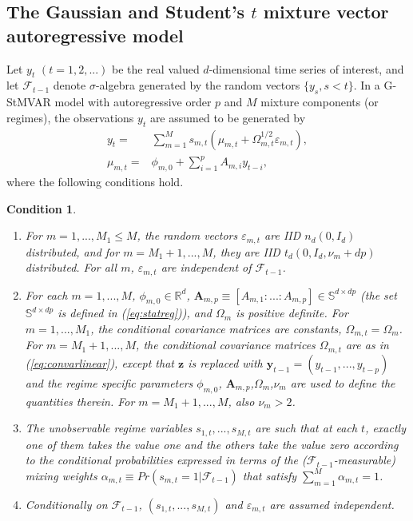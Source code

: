 \documentclass[nojss]{jss}
\newtheorem{condition}{Condition}
\begin{document}
\subsection{The Gaussian and Student's $t$ mixture vector autoregressive model}
Let $y_t$ $(t=1,2,...)$ be the real valued $d$-dimensional time series of interest, and let $\mathcal{F}_{t-1}$ denote $\sigma$-algebra generated by the random vectors $\lbrace y_s, s<t \rbrace$. In a G-StMVAR model \citep{Virolainen2:2021} with autoregressive order $p$ and $M$ mixture components (or regimes),  the observations $y_t$ are assumed to be generated by
\begin{align}
y_t = & \sum_{m=1}^Ms_{m,t}(\mu_{m,t} + \Omega_{m,t}^{1/2}\varepsilon_{m,t}),\label{eq:def} \\
\mu_{m,t} = & \phi_{m,0} + \sum_{i=1}^pA_{m,i}y_{t-i},\label{eq:mu_mt}
\end{align}
where the following conditions hold.
%
\begin{condition}\label{cond:def}
\
\begin{enumerate}
\item For $m=1,...,M_1\leq M$,  the random vectors $\varepsilon_{m,t}$ are IID $n_d(0, I_d)$ distributed,  and for $m=M_1+1,..., M$, they are IID $t_d(0, I_d,\nu_m + dp)$ distributed. For all $m$,  $\varepsilon_{m,t}$ are independent of $\mathcal{F}_{t-1}$.
\item For each $m=1,...,M$‚ $\phi_{m,0}\in\mathbb{R}^d$,  $\boldsymbol{A}_{m,p} \equiv [A_{m,1}:...:A_{m,p}]\in\mathbb{S}^{d\times dp}$ (the set $\mathbb{S}^{d\times dp}$ is defined in (\ref{eq:statreg})),  and $\Omega_m$ is positive definite.  For $m=1,...,M_1$,  the conditional covariance matrices are constants, $\Omega_{m,t}=\Omega_m$.  For $m=M_1+1,...,M$,  the conditional covariance matrices $\Omega_{m,t}$ are as in (\ref{eq:convarlinear}), except that $\boldsymbol{z}$ is replaced with $\boldsymbol{y}_{t-1}=(y_{t-1},...,y_{t-p})$ and the regime specific parameters $\phi_{m,0}$, $\boldsymbol{A}_{m,p}$,$\Omega_m$,$\nu_m$ are used to define the quantities therein.  For $m=M_1+1,...,M$, also  $\nu_m>2$.
\item The unobservable regime variables $s_{1,t},...,s_{M,t}$ are such that at each $t$, exactly one of them takes the value one and the others take the value zero according to the conditional probabilities expressed in terms of the ($\mathcal{F}_{t-1}$-measurable) mixing weights $\alpha_{m,t}\equiv Pr(s_{m,t}=1|\mathcal{F}_{t-1})$ that satisfy $\sum_{m=1}^M\alpha_{m,t}=1$.
\item Conditionally on $\mathcal{F}_{t-1}$,  $(s_{1,t},...,s_{M,t})$ and $\varepsilon_{m,t}$ are assumed independent.
\end{enumerate}
\end{condition}
\end{document}
